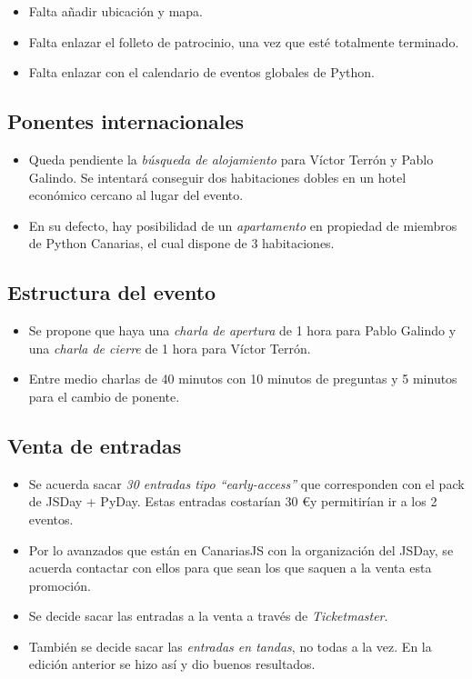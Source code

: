 \documentclass[a4paper, 12pt]{article}
\begin{document}
\begin{itemize}
    \item Falta añadir ubicación y mapa.
    \item Falta enlazar el folleto de patrocinio, una vez que esté totalmente terminado.
    \item Falta enlazar con el calendario de eventos globales de Python.
\end{itemize}

\subsection*{Ponentes internacionales}

\begin{itemize}
    \item Queda pendiente la \textit{búsqueda de alojamiento} para Víctor Terrón y Pablo Galindo. Se intentará conseguir dos habitaciones dobles en un hotel económico cercano al lugar del evento.
    \item En su defecto, hay posibilidad de un \textit{apartamento} en propiedad de miembros de Python Canarias, el cual dispone de 3 habitaciones.
\end{itemize}

\subsection*{Estructura del evento}

\begin{itemize}
    \item Se propone que haya una \textit{charla de apertura} de 1 hora para Pablo Galindo y una \textit{charla de cierre} de 1 hora para Víctor Terrón.
    \item Entre medio charlas de 40 minutos con 10 minutos de preguntas y 5 minutos para el cambio de ponente.
\end{itemize}

\subsection*{Venta de entradas}

\begin{itemize}
    \item Se acuerda sacar \textit{30 entradas tipo ``early-access''} que corresponden con el pack de JSDay + PyDay. Estas entradas costarían 30 \euro y permitirían ir a los 2 eventos.
    \item Por lo avanzados que están en CanariasJS con la organización del JSDay, se acuerda contactar con ellos para que sean los que saquen a la venta esta promoción.
    \item Se decide sacar las entradas a la venta a través de \textit{Ticketmaster}.
    \item También se decide sacar las \textit{entradas en tandas}, no todas a la vez. En la edición anterior se hizo así y dio buenos resultados.
\end{itemize}
\end{document}
